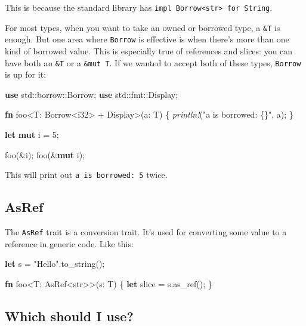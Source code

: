 \documentclass[a4paper,]{book}
\newenvironment{Shaded}{\begin{snugshade}}{\end{snugshade}}
\newcommand{\KeywordTok}[1]{\textcolor[rgb]{0.13,0.29,0.53}{\textbf{{#1}}}}
\newcommand{\DataTypeTok}[1]{\textcolor[rgb]{0.13,0.29,0.53}{{#1}}}
\newcommand{\DecValTok}[1]{\textcolor[rgb]{0.00,0.00,0.81}{{#1}}}
\newcommand{\StringTok}[1]{\textcolor[rgb]{0.31,0.60,0.02}{{#1}}}
\newcommand{\BuiltInTok}[1]{{#1}}
\newcommand{\PreprocessorTok}[1]{\textcolor[rgb]{0.56,0.35,0.01}{\textit{{#1}}}}
\newcommand{\NormalTok}[1]{{#1}}
\begin{document}
This is because the standard library has
\texttt{impl\ Borrow\textless{}str\textgreater{}\ for\ String}.

For most types, when you want to take an owned or borrowed type, a
\texttt{\&T} is enough. But one area where \texttt{Borrow} is effective
is when there's more than one kind of borrowed value. This is especially
true of references and slices: you can have both an \texttt{\&T} or a
\texttt{\&mut\ T}. If we wanted to accept both of these types,
\texttt{Borrow} is up for it:

\begin{Shaded}
\begin{Highlighting}[]
\KeywordTok{use} \NormalTok{std::borrow::Borrow;}
\KeywordTok{use} \NormalTok{std::fmt::}\BuiltInTok{Display}\NormalTok{;}

\KeywordTok{fn} \NormalTok{foo<T: Borrow<}\DataTypeTok{i32}\NormalTok{> + }\BuiltInTok{Display}\NormalTok{>(a: T) \{}
    \PreprocessorTok{println!}\NormalTok{(}\StringTok{"a is borrowed: \{\}"}\NormalTok{, a);}
\NormalTok{\}}

\KeywordTok{let} \KeywordTok{mut} \NormalTok{i = }\DecValTok{5}\NormalTok{;}

\NormalTok{foo(&i);}
\NormalTok{foo(&}\KeywordTok{mut} \NormalTok{i);}
\end{Highlighting}
\end{Shaded}

This will print out \texttt{a\ is\ borrowed:\ 5} twice.

\subsection{AsRef}\label{asref}

The \texttt{AsRef} trait is a conversion trait. It's used for converting
some value to a reference in generic code. Like this:

\begin{Shaded}
\begin{Highlighting}[]
\KeywordTok{let} \NormalTok{s = }\StringTok{"Hello"}\NormalTok{.to_string();}

\KeywordTok{fn} \NormalTok{foo<T: AsRef<}\DataTypeTok{str}\NormalTok{>>(s: T) \{}
    \KeywordTok{let} \NormalTok{slice = s.as_ref();}
\NormalTok{\}}
\end{Highlighting}
\end{Shaded}

\subsection{Which should I use?}\label{which-should-i-use}
\end{document}

